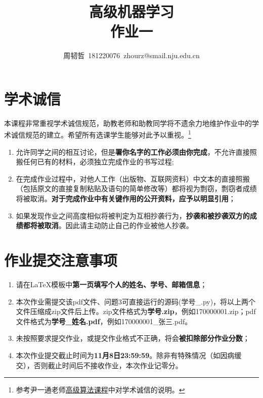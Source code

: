 \documentclass[a4paper,UTF8]{article}
\numberwithin{equation}{section}
\begin{document}
\title{高级机器学习\\
作业一}
\author{周韧哲\, 181220076\, zhourz@smail.nju.edu.cn} 
\maketitle

\section*{学术诚信}

本课程非常重视学术诚信规范，助教老师和助教同学将不遗余力地维护作业中的学术诚信规范的建立。希望所有选课学生能够对此予以重视。\footnote{参考尹一通老师\href{http://tcs.nju.edu.cn/wiki/}{高级算法课程}中对学术诚信的说明。}

\begin{tcolorbox}
	\begin{enumerate}
		\item[(1)] 允许同学之间的相互讨论，但是{\color{red}\textbf{署你名字的工作必须由你完成}}，不允许直接照搬任何已有的材料，必须独立完成作业的书写过程;
		\item[(2)] 在完成作业过程中，对他人工作（出版物、互联网资料）中文本的直接照搬（包括原文的直接复制粘贴及语句的简单修改等）都将视为剽窃，剽窃者成绩将被取消。{\color{red}\textbf{对于完成作业中有关键作用的公开资料，应予以明显引用}}；
		\item[(3)] 如果发现作业之间高度相似将被判定为互相抄袭行为，{\color{red}\textbf{抄袭和被抄袭双方的成绩都将被取消}}。因此请主动防止自己的作业被他人抄袭。
	\end{enumerate}
\end{tcolorbox}

\section*{作业提交注意事项}
\begin{tcolorbox}
	\begin{enumerate}
		\item[(1)] 请在LaTeX模板中{\color{red}\textbf{第一页填写个人的姓名、学号、邮箱信息}}；
		\item[(2)] 本次作业需提交该pdf文件、问题3可直接运行的源码(学号\_.py)，将以上两个文件压缩成zip文件后上传。zip文件格式为{\color{red}\textbf{学号.zip}}，例如170000001.zip；pdf文件格式为{\color{red}\textbf{学号\_姓名.pdf}}，例如170000001\_张三.pdf。
		\item[(3)] 未按照要求提交作业，或提交作业格式不正确，将会{\color{red}\textbf{被扣除部分作业分数}}；
		\item[(4)] 本次作业提交截止时间为{\color{red}\textbf{11月8日23:59:59}}。除非有特殊情况（如因病缓交），否则截止时间后不接收作业，本次作业记零分。
	\end{enumerate}
\end{tcolorbox}
\end{document}
